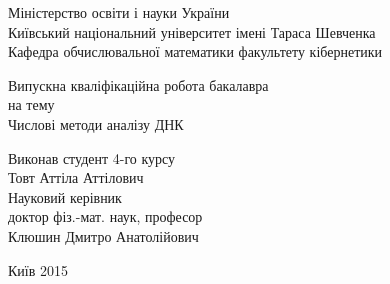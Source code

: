 \documentclass[14pt]{extarticle}
\begin{document}
\begin{titlepage}
\begin{center}
Міністерство освіти і науки України \\
Київський національний університет імені Тараса Шевченка \\
Кафедра обчислювальної математики факультету кібернетики

\vfill

\Large Випускна кваліфікаційна робота бакалавра \\
на тему \\
\Large Числові методи аналізу ДНК
\end{center}

\vfill

\begin{flushright}
Виконав студент 4-го курсу \\
Товт Аттіла Аттілович \\

Науковий керівник \\
доктор фіз.-мат. наук, професор \\
Клюшин Дмитро Анатолійович
\end{flushright}

\center Київ 2015


\end{titlepage}
\end{document}
